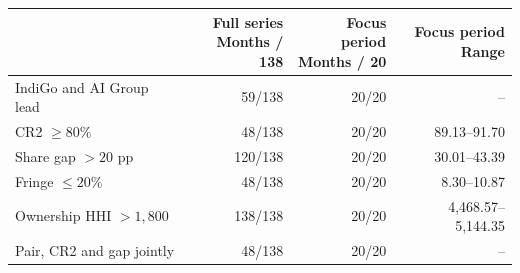 \begin{tabular}{@{}lrrr@{}}
\toprule
 & \shortstack{Full series\\Months / 138} & \shortstack{Focus period\\Months / 20} & \shortstack{Focus period\\Range} \\
\midrule
IndiGo and AI Group lead & 59/138 & 20/20 & -- \\
CR2 $\geq 80\%$ & 48/138 & 20/20 & 89.13--91.70 \\
Share gap $>20$ pp & 120/138 & 20/20 & 30.01--43.39 \\
Fringe $\leq 20\%$ & 48/138 & 20/20 & 8.30--10.87 \\
Ownership HHI $>1{,}800$ & 138/138 & 20/20 & 4,468.57--5,144.35 \\
Pair, CR2 and gap jointly & 48/138 & 20/20 & -- \\
\bottomrule
\end{tabular}
